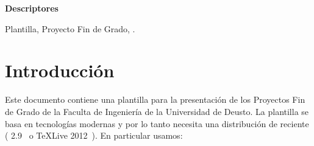 \documentclass{DeustoFDP}
\begin{document}
\vspace{2em}

{\Large\bfseries\sectionfont Descriptores}
\vspace{3\medskipamount}

Plantilla, Proyecto Fin de Grado, .

\cleardoublepage\tableofcontents
\cleardoublepage\listoffigures
\cleardoublepage\listoftables
\cleardoublepage\listoflistings

\mainmatter
\pagestyle{phdthesis}

\chapter{Introducci\'on}\label{cha:introduccion}

Este documento contiene una plantilla para la presentaci\'on de los Proyectos
Fin de Grado de la Faculta de Ingenier\'ia de la Universidad de Deusto. La
plantilla se basa en tecnolog\'ias modernas y por lo tanto necesita una
distribuci\'on de  reciente ( 2.9~\cite{miktex} o
TeXLive 2012~\cite{texlive}). En particular usamos:
\end{document}
